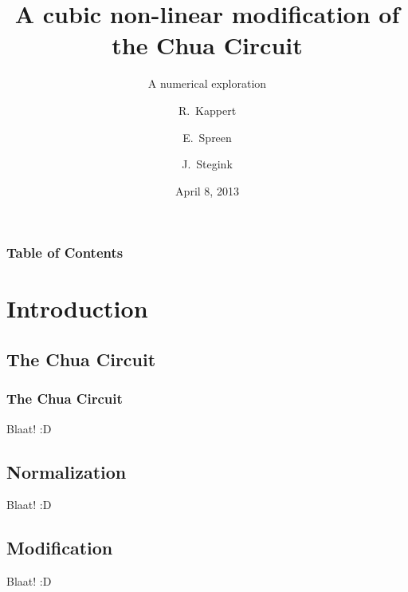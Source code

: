 \documentclass{beamer}
\title[The Chua Circuit]%
{A cubic non-linear modification of the Chua Circuit}
\subtitle{A numerical exploration}
\author[Kappert, Spreen, Stegink]%
{R.~Kappert \and E.~Spreen \and J.~Stegink}
\institute{University of Groningen}
\date{April 8, 2013}
\begin{document}
\frame{\titlepage} %

\begin{frame}
  \setcounter{tocdepth}{1}
  \frametitle{Table of Contents}
  \tableofcontents
\end{frame}

\section{Introduction}
\subsection[Chua Circuit]{The Chua Circuit}

\begin{frame}
  \frametitle{The Chua Circuit}
  Blaat! :D
\end{frame}

\subsection{Normalization}

\begin{frame}
  Blaat! :D
\end{frame}

\subsection{Modification}

\begin{frame}
  Blaat! :D
\end{frame}
\end{document}
